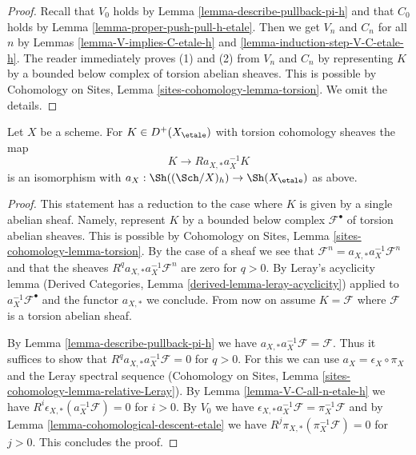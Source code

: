 \begin{proof}
Recall that $V_0$ holds by Lemma \ref{lemma-describe-pullback-pi-h} and
that $C_0$ holds by Lemma \ref{lemma-proper-push-pull-h-etale}.
Then we get $V_n$ and $C_n$ for all
$n$ by Lemmas \ref{lemma-V-implies-C-etale-h} and
\ref{lemma-induction-step-V-C-etale-h}.
The reader immediately proves (1) and (2) from $V_n$ and $C_n$
by representing $K$
by a bounded below complex of torsion abelian sheaves.
This is possible by Cohomology on Sites, Lemma
\ref{sites-cohomology-lemma-torsion}. We omit the details.
\end{proof}

\begin{lemma}
\label{lemma-cohomological-descent-etale-h}
Let $X$ be a scheme. For $K \in D^+(X_\etale)$ with torsion cohomology
sheaves the map
$$
K \longrightarrow Ra_{X, *}a_X^{-1}K
$$
is an isomorphism with $a_X : \Sh((\Sch/X)_h) \to \Sh(X_\etale)$ as above.
\end{lemma}

\begin{proof}
This statement has a reduction to the case where
$K$ is given by a single abelian sheaf. Namely, represent $K$
by a bounded below complex $\mathcal{F}^\bullet$ of torsion
abelian sheaves. This is possible by Cohomology on Sites, Lemma
\ref{sites-cohomology-lemma-torsion}. By the case of a
sheaf we see that
$\mathcal{F}^n = a_{X, *} a_X^{-1} \mathcal{F}^n$
and that the sheaves $R^qa_{X, *}a_X^{-1}\mathcal{F}^n$
are zero for $q > 0$. By Leray's acyclicity lemma
(Derived Categories, Lemma \ref{derived-lemma-leray-acyclicity})
applied to $a_X^{-1}\mathcal{F}^\bullet$
and the functor $a_{X, *}$ we conclude. From now on assume $K = \mathcal{F}$
where $\mathcal{F}$ is a torsion abelian sheaf.

\medskip\noindent
By Lemma \ref{lemma-describe-pullback-pi-h} we have
$a_{X, *}a_X^{-1}\mathcal{F} = \mathcal{F}$. Thus it suffices to show that
$R^qa_{X, *}a_X^{-1}\mathcal{F} = 0$ for $q > 0$.
For this we can use $a_X = \epsilon_X \circ \pi_X$ and
the Leray spectral sequence
(Cohomology on Sites, Lemma \ref{sites-cohomology-lemma-relative-Leray}).
By Lemma \ref{lemma-V-C-all-n-etale-h}
we have $R^i\epsilon_{X, *}(a_X^{-1}\mathcal{F}) = 0$ for $i > 0$.
By $V_0$ we have
$\epsilon_{X, *}a_X^{-1}\mathcal{F} = \pi_X^{-1}\mathcal{F}$
and by Lemma \ref{lemma-cohomological-descent-etale} we have
$R^j\pi_{X, *}(\pi_X^{-1}\mathcal{F}) = 0$ for $j > 0$.
This concludes the proof.
\end{proof}

